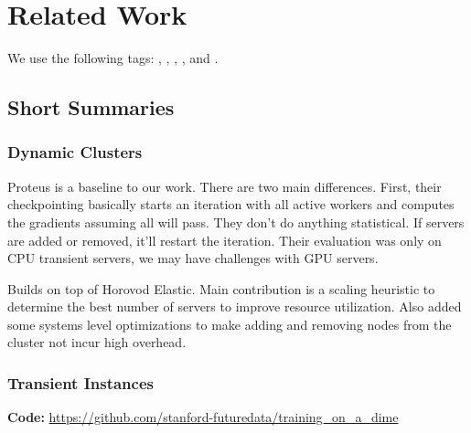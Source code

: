 \chapter{Related Work}
\label{chap:related work}

We use the following tags: \tagdynamic{}, \tagtransient{},
\tagmodelparallelism{}, \tagdataparallelism{}, and \tagoptimizer{}.

\section{Short Summaries}

\subsection{Dynamic Clusters}


\noindent \tagdynamic{} \tagdataparallelism{}

Proteus is a baseline to our work.
There are two main differences.
First, their checkpointing basically starts an iteration with all active workers
and computes the gradients assuming all will pass.
They don't do anything statistical.
If servers are added or removed, it'll restart the iteration.
Their evaluation was only on CPU transient servers, we may have challenges with
GPU servers.


\noindent \tagdynamic{} \tagdataparallelism{}
Builds on top of Horovod Elastic.
Main contribution is a scaling heuristic to determine the best number of
servers to improve resource utilization.
Also added some systems level optimizations to make adding and removing nodes
from the cluster not incur high overhead.



\noindent \tagdynamic{}

\subsection{Transient Instances}


\noindent \tagdynamic{} \tagdataparallelism{}

\noindent \textbf{Code:} \url{https://github.com/stanford-futuredata/training_on_a_dime}

